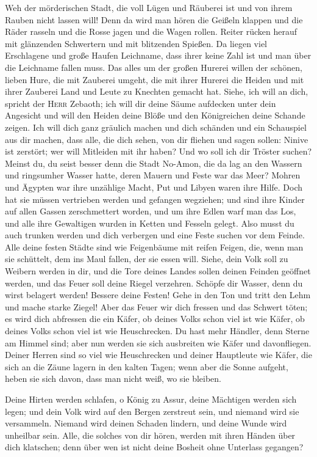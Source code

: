  Weh der mörderischen Stadt, die voll Lügen und Räuberei
ist und von ihrem Rauben nicht lassen will!  Denn da wird
man hören die Geißeln klappen und die Räder rasseln und die Rosse jagen
und die Wagen rollen.  Reiter rücken herauf mit glänzenden
Schwertern und mit blitzenden Spießen. Da liegen viel Erschlagene und
große Haufen Leichname, dass ihrer keine Zahl ist und man über die
Leichname fallen muss.  Das alles um der großen Hurerei
willen der schönen, lieben Hure, die mit Zauberei umgeht, die mit ihrer
Hurerei die Heiden und mit ihrer Zauberei Land und Leute zu Knechten
gemacht hat.  Siehe, ich will an dich, spricht der
\textsc{Herr} Zebaoth; ich will dir deine Säume aufdecken unter dein
Angesicht und will den Heiden deine Blöße und den Königreichen deine
Schande zeigen.  Ich will dich ganz gräulich machen und
dich schänden und ein Schauspiel aus dir machen,  dass
alle, die dich sehen, von dir fliehen und sagen sollen: Ninive ist
zerstört; wer will Mitleiden mit ihr haben? Und wo soll ich dir Tröster
suchen?  Meinst du, du seist besser denn die Stadt
No-Amon, die da lag an den Wassern und ringsumher Wasser hatte, deren
Mauern und Feste war das Meer?  Mohren und Ägypten war
ihre unzählige Macht, Put und Libyen waren ihre Hilfe. 
Doch hat sie müssen vertrieben werden und gefangen wegziehen; und sind
ihre Kinder auf allen Gassen zerschmettert worden, und um ihre Edlen
warf man das Los, und alle ihre Gewaltigen wurden in Ketten und Fesseln
gelegt.  Also musst du auch trunken werden und dich
verbergen und eine Feste suchen vor dem Feinde.  Alle
deine festen Städte sind wie Feigenbäume mit reifen Feigen, die, wenn
man sie schüttelt, dem ins Maul fallen, der sie essen will.
 Siehe, dein Volk soll zu Weibern werden in dir, und die
Tore deines Landes sollen deinen Feinden geöffnet werden, und das Feuer
soll deine Riegel verzehren.  Schöpfe dir Wasser, denn du
wirst belagert werden! Bessere deine Festen! Gehe in den Ton und tritt
den Lehm und mache starke Ziegel!  Aber das Feuer wir
dich fressen und das Schwert töten; es wird dich abfressen die ein
Käfer, ob deines Volks schon viel ist wie Käfer, ob deines Volks schon
viel ist wie Heuschrecken.  Du hast mehr Händler, denn
Sterne am Himmel sind; aber nun werden sie sich ausbreiten wie Käfer und
davonfliegen.  Deiner Herren sind so viel wie
Heuschrecken und deiner Hauptleute wie Käfer, die sich an die Zäune
lagern in den kalten Tagen; wenn aber die Sonne aufgeht, heben sie sich
davon, dass man nicht weiß, wo sie bleiben.

 Deine Hirten werden schlafen, o König zu Assur, deine
Mächtigen werden sich legen; und dein Volk wird auf den Bergen zerstreut
sein, und niemand wird sie versammeln.  Niemand wird
deinen Schaden lindern, und deine Wunde wird unheilbar sein. Alle, die
solches von dir hören, werden mit ihren Händen über dich klatschen; denn
über wen ist nicht deine Bosheit ohne Unterlass gegangen?
